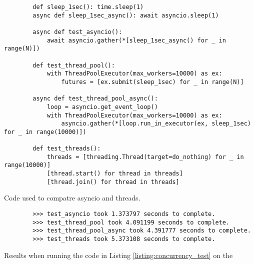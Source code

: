 \begin{listing}[H]
    \begin{verbatim}
        def sleep_1sec(): time.sleep(1)
        async def sleep_1sec_async(): await asyncio.sleep(1)

        async def test_asyncio():
            await asyncio.gather(*[sleep_1sec_async() for _ in range(N)])

        def test_thread_pool():
            with ThreadPoolExecutor(max_workers=10000) as ex:
                futures = [ex.submit(sleep_1sec) for _ in range(N)]

        async def test_thread_pool_async():
            loop = asyncio.get_event_loop()
            with ThreadPoolExecutor(max_workers=10000) as ex:
                asyncio.gather(*[loop.run_in_executor(ex, sleep_1sec) for _ in range(10000)])

        def test_threads():
            threads = [threading.Thread(target=do_nothing) for _ in range(10000)]
            [thread.start() for thread in threads]
            [thread.join() for thread in threads]
    \end{verbatim}
    \caption{Code used to compatre asyncio and threads.}
    \label{listing:concurrency_test}
\end{listing}
\begin{listing}[H]
    \begin{verbatim}
        >>> test_asyncio took 1.373797 seconds to complete.
        >>> test_thread_pool took 4.091199 seconds to complete.
        >>> test_thread_pool_async took 4.391777 seconds to complete.
        >>> test_threads took 5.373108 seconds to complete.
    \end{verbatim}
    \caption{Results when running the code in Listing  \ref{listing:concurrency_test} on the \jx}
\end{listing}





